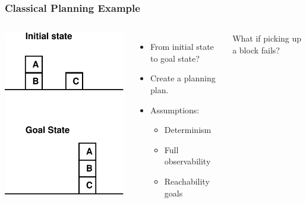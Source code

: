 \documentclass{beamer}
\let\origframetitle=\frametitle
\renewcommand\frametitle[1]{\origframetitle{\textbf{\large{\textrm{#1}}}}}
\begin{document}
\begin{frame}
  \frametitle{Classical Planning Example}

  \begin{columns}
    \includegraphics[width=\textwidth]{../presentation-plan/blocksworld.pdf}


    \begin{itemize}
      \item From initial state to goal state?
      \item Create a planning plan.
      \item Assumptions:
        \begin{itemize}
          \item Determinism
          \item Full observability
          \item Reachability goals
        \end{itemize}
    \end{itemize}

What if picking up a block fails?

  \end{columns}

\end{frame}
\end{document}
